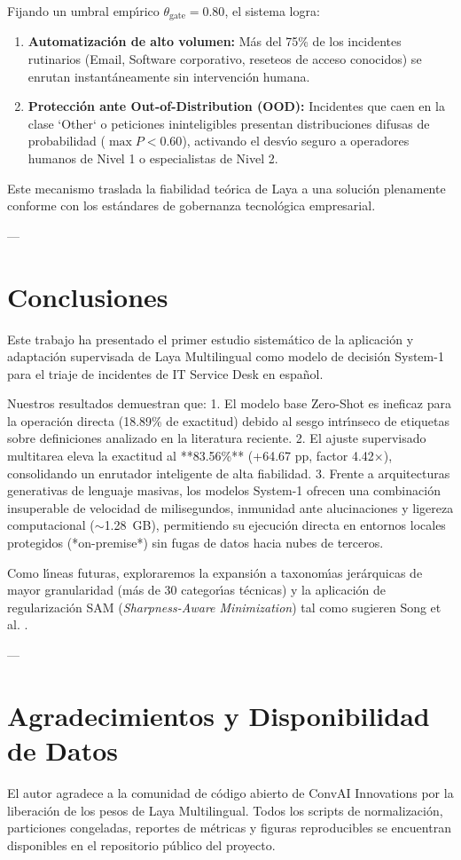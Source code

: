 \documentclass[10pt,journal,compsoc]{IEEEtran}
\begin{document}
Fijando un umbral emp\'{\i}rico $\theta_{\text{gate}} = 0.80$, el sistema logra:
\begin{enumerate}
    \item \textbf{Automatizaci\'on de alto volumen:} M\'as del 75\% de los incidentes rutinarios (Email, Software corporativo, reseteos de acceso conocidos) se enrutan instant\'aneamente sin intervenci\'on humana.
    \item \textbf{Protecci\'on ante Out-of-Distribution (OOD):} Incidentes que caen en la clase `Other` o peticiones ininteligibles presentan distribuciones difusas de probabilidad ($\max P < 0.60$), activando el desv\'{\i}o seguro a operadores humanos de Nivel 1 o especialistas de Nivel 2.
\end{enumerate}

Este mecanismo traslada la fiabilidad te\'orica de Laya a una soluci\'on plenamente conforme con los est\'andares de gobernanza tecnol\'ogica empresarial.

---

\section{Conclusiones}

Este trabajo ha presentado el primer estudio sistem\'atico de la aplicaci\'on y adaptaci\'on supervisada de Laya Multilingual como modelo de decisi\'on System-1 para el triaje de incidentes de IT Service Desk en espa\~nol.

Nuestros resultados demuestran que:
1. El modelo base Zero-Shot es ineficaz para la operaci\'on directa (18.89\% de exactitud) debido al sesgo intr\'{\i}nseco de etiquetas sobre definiciones analizado en la literatura reciente.
2. El ajuste supervisado multitarea eleva la exactitud al **83.56\%** (+64.67 pp, factor 4.42$\times$), consolidando un enrutador inteligente de alta fiabilidad.
3. Frente a arquitecturas generativas de lenguaje masivas, los modelos System-1 ofrecen una combinaci\'on insuperable de velocidad de milisegundos, inmunidad ante alucinaciones y ligereza computacional ($\sim$1.28~GB), permitiendo su ejecuci\'on directa en entornos locales protegidos (*on-premise*) sin fugas de datos hacia nubes de terceros.

Como l\'{\i}neas futuras, exploraremos la expansi\'on a taxonom\'{\i}as jer\'arquicas de mayor granularidad (m\'as de 30 categor\'{\i}as t\'ecnicas) y la aplicaci\'on de regularizaci\'on SAM (\emph{Sharpness-Aware Minimization}) tal como sugieren Song et al. \cite{song2026deepopen}.

---

\section*{Agradecimientos y Disponibilidad de Datos}
El autor agradece a la comunidad de c\'odigo abierto de ConvAI Innovations por la liberaci\'on de los pesos de Laya Multilingual. Todos los scripts de normalizaci\'on, particiones congeladas, reportes de m\'etricas y figuras reproducibles se encuentran disponibles en el repositorio p\'ublico del proyecto.



\end{document}
